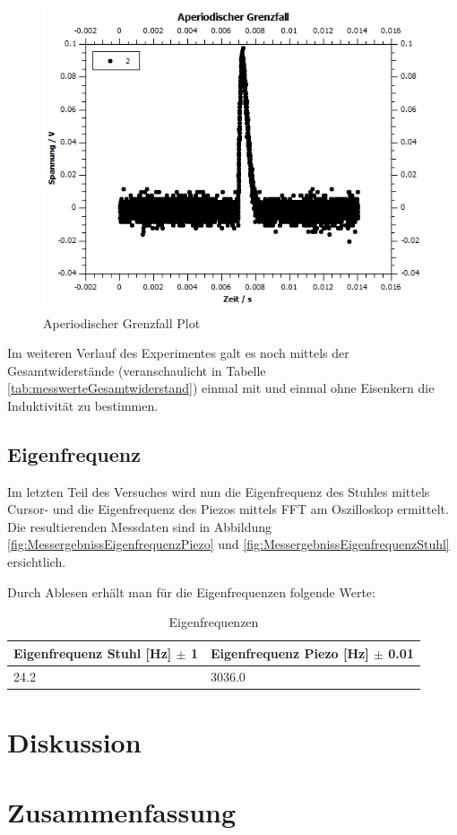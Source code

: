 \documentclass[12pt,a4paper,twoside]{article}
\begin{document}
\begin{figure}[H]
    \centering
    \includegraphics[width=0.6\linewidth, angle=0]{nudes/Aperiodischer Grenzfall.jpg}
    \caption{Aperiodischer Grenzfall Plot}
    \label{fig:AperiodischerGrenzfallPlot}
\end{figure}

\noindent
Im weiteren Verlauf des Experimentes galt es noch mittels der Gesamtwiderstände (veranschaulicht in Tabelle \ref{tab:messwerteGesamtwiderstand}) einmal mit und einmal ohne Eisenkern die Induktivität zu bestimmen.



\subsection{Eigenfrequenz}

Im letzten Teil des Versuches wird nun die Eigenfrequenz des Stuhles mittels Cursor- und die Eigenfrequenz des Piezos mittels FFT am Oszilloskop ermittelt. Die resultierenden Messdaten sind in Abbildung \ref{fig:MessergebnissEigenfrequenzPiezo} und \ref{fig:MessergebnissEigenfrequenzStuhl} ersichtlich.

Durch Ablesen erhält man für die Eigenfrequenzen folgende Werte:

\begin{table}[H]
    \centering
    \caption{Eigenfrequenzen}
    \label{tab:Eigenfrequenzen}
    \begin{tabular}{| l | l |}
        \hline
        Eigenfrequenz Stuhl [Hz] $\pm$ 1  & Eigenfrequenz Piezo [Hz] $\pm$ 0.01 \\
        \hline
        24.2 & 3036.0 \\
        \hline
    \end{tabular}
\end{table}


\section{Diskussion} %


\section{Zusammenfassung} %


\printbibliography[heading=bibintoc]
\end{document}
